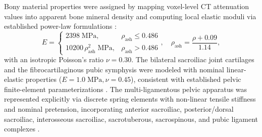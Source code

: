 Bony material properties were assigned by mapping voxel-level CT attenuation values into apparent bone mineral density and computing local elastic moduli via established power-law formulations \citep{CarterHayes1977,Keller1994,Morgan2003Trabecular,Frost1987,Huiskes1987}:
\begin{equation}
E = \begin{cases}
2398\;\text{MPa}, & \rho_{\text{ash}} \le 0.486\\
10200\,\rho_{\text{ash}}^{2}\;\text{MPa}, & \rho_{\text{ash}} > 0.486
\end{cases},
\quad
\rho_{\text{ash}} = \frac{\rho + 0.09}{1.14},
\end{equation}
with an isotropic Poisson's ratio $\nu = 0.30$. The bilateral sacroiliac joint cartilages and the fibrocartilaginous pubic symphysis were modeled with nominal linear-elastic properties ($E = 1.0\;\text{MPa}, \nu = 0.45$), consistent with established pelvic finite-element parameterizations \citep{Anderson2020,Yang2020,Calixte2022}. The multi-ligamentous pelvic apparatus was represented explicitly via discrete spring elements with non-linear tensile stiffness and nominal pretension, incorporating anterior sacroiliac, posterior/dorsal sacroiliac, interosseous sacroiliac, sacrotuberous, sacrospinous, and pubic ligament complexes \citep{Hammer2013,Hammer2019}.


